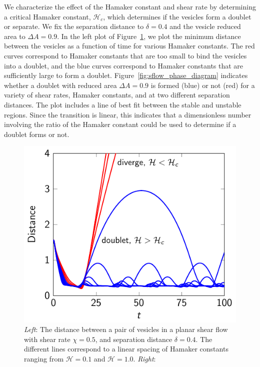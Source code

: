\documentclass[prf,superscriptaddress,showkeys]{revtex4-1}
\begin{document}
We characterize the effect of the Hamaker constant and shear rate by
determining a critical Hamaker constant, $\mathcal{H}_c$, which
determines if the vesicles form a doublet or separate.  We fix the
separation distance to $\delta = 0.4$ and the vesicle reduced area to
$\Delta A = 0.9$.  In the left plot of
Figure~\ref{fig:sflow_distance}, we plot the minimum distance
between the vesicles as a function of time for various Hamaker
constants.  The red curves correspond to Hamaker constants that are too
small to bind the vesicles into a doublet, and the blue curves
correspond to Hamaker constants that are sufficiently large to form a
doublet.  Figure~\ref{fig:sflow_phase_diagram} indicates whether a
doublet with reduced area $\Delta A = 0.9$ is formed (blue) or not (red)
for a variety of shear rates, Hamaker constants, and at two different
separation distances.  The plot includes a line of best fit between the
stable and unstable regions.  Since the transition is linear, this
indicates that a dimensionless number involving the ratio of the Hamaker
constant could be used to determine if a doublet forms or not.

\begin{figure}
  \includegraphics[height=0.27\textwidth]{figs/shear_adR4em1Chi5em1_ra090.pdf}
  \caption{\label{fig:sflow_distance} {\em Left}: The distance between a
  pair of vesicles in a planar shear flow with shear rate $\chi=0.5$,
  and separation distance $\delta = 0.4$.  The different lines
  correspond to a linear spacing of Hamaker constants ranging from
  $\mathcal{H}=0.1$ and $\mathcal{H}=1.0$.  {\em Right}:
  }
\end{figure}
\end{document}
